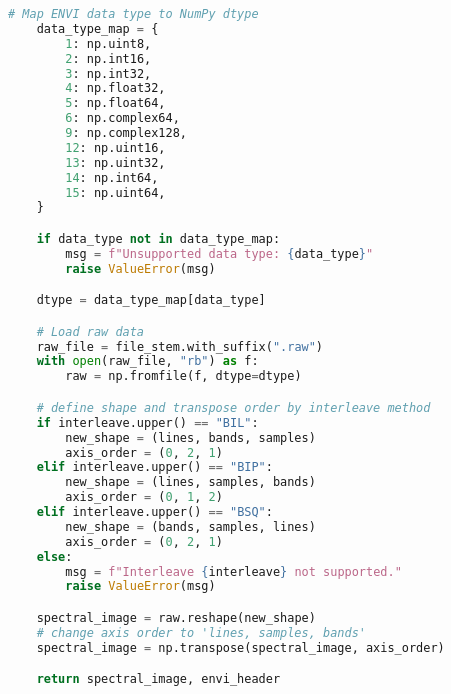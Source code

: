 \begin{lstlisting}[language=python, caption=Load ENVI format images, label={code:load-envi}]
    # Map ENVI data type to NumPy dtype
    data_type_map = {
        1: np.uint8,
        2: np.int16,
        3: np.int32,
        4: np.float32,
        5: np.float64,
        6: np.complex64,
        9: np.complex128,
        12: np.uint16,
        13: np.uint32,
        14: np.int64,
        15: np.uint64,
    }

    if data_type not in data_type_map:
        msg = f"Unsupported data type: {data_type}"
        raise ValueError(msg)

    dtype = data_type_map[data_type]

    # Load raw data
    raw_file = file_stem.with_suffix(".raw")
    with open(raw_file, "rb") as f:
        raw = np.fromfile(f, dtype=dtype)

    # define shape and transpose order by interleave method
    if interleave.upper() == "BIL":
        new_shape = (lines, bands, samples)
        axis_order = (0, 2, 1)
    elif interleave.upper() == "BIP":
        new_shape = (lines, samples, bands)
        axis_order = (0, 1, 2)
    elif interleave.upper() == "BSQ":
        new_shape = (bands, samples, lines)
        axis_order = (0, 2, 1)
    else:
        msg = f"Interleave {interleave} not supported."
        raise ValueError(msg)

    spectral_image = raw.reshape(new_shape)
    # change axis order to 'lines, samples, bands'
    spectral_image = np.transpose(spectral_image, axis_order)

    return spectral_image, envi_header

\end{lstlisting}
